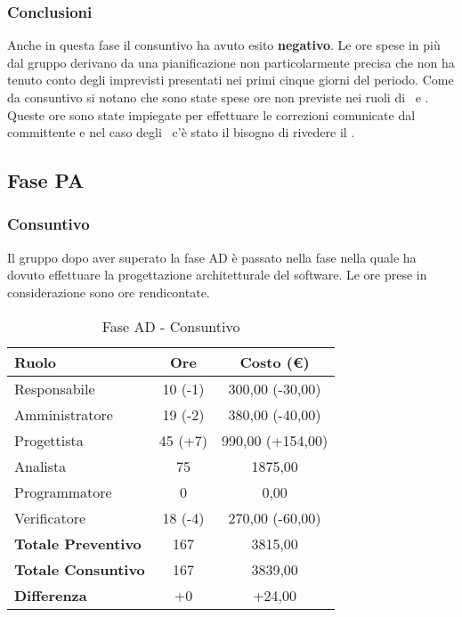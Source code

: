 \documentclass[../PianoProgetto.tex]{subfiles}
\begin{document}
	\subsubsection{Conclusioni}	
     Anche in questa fase il consuntivo ha avuto esito \textbf{negativo}.
     Le ore spese in più dal gruppo derivano da una pianificazione non particolarmente precisa che non ha tenuto conto degli imprevisti presentati nei primi cinque giorni del periodo.
     Come da consuntivo si notano che sono state spese ore non previste nei ruoli di \amministratore\ e \analista. Queste ore sono state impiegate per effettuare le correzioni comunicate dal committente e nel caso degli \amministratori\ c'è stato il bisogno di rivedere il \pianodiqualifica. 
	
     \subsection{Fase PA}
	\subsubsection{Consuntivo}
	Il gruppo dopo aver superato la fase AD è passato nella fase nella quale ha dovuto effettuare la progettazione architetturale del software\g. Le ore prese in considerazione sono ore rendicontate. 
	
	\begin{table}[h]
		\centering
		\begin{tabular}{l * {2}{c}}
			\toprule
			\textbf{Ruolo} & \textbf{Ore} & \textbf{Costo (\euro{})} \\
			\midrule
			Responsabile &		10 (-1) & 300,00  (-30,00) \\
			Amministratore &	19 (-2) & 380,00  (-40,00) \\
			Progettista & 		45 (+7) & 990,00  (+154,00)\\
			Analista & 			75		& 1875,00          \\
			Programmatore & 	0		& 0,00 				\\
			Verificatore & 		18 (-4) & 270,00 (-60,00)	\\
			\midrule
			\textbf{Totale Preventivo} & 167
			& 3815,00
			\\		
			\textbf{Totale Consuntivo} & 167 & 3839,00 
			\\
			\midrule
			\textbf{Differenza} & +0 & +24,00 \\
			\bottomrule
		\end{tabular}
		
		\caption{Fase AD - Consuntivo}
		\label{tab:consuntivoAD}
		
	\end{table}		
	
\end{document}
